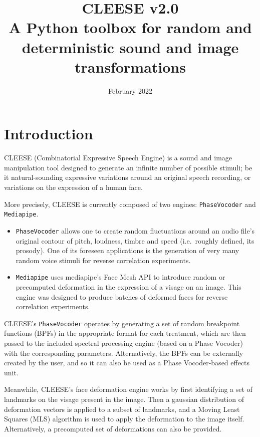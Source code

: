 \documentclass[oneside,10pt]{article}
\begin{document}
\title{\textbf{CLEESE} {\large v2.0} \\ {\Large A Python toolbox for random and
deterministic sound and image transformations}}
\author{February 2022}
\date{}
\maketitle

\tableofcontents

\section{Introduction}

CLEESE (Combinatorial Expressive Speech Engine) is a sound and image
manipulation tool designed to generate an infinite number of possible stimuli;
be it natural-sounding expressive variations around an original speech
recording, or variations on the expression of a human face.

More precisely, CLEESE is currently composed of two engines:
\texttt{PhaseVocoder} and \texttt{Mediapipe}.

\begin{itemize}
    \item \texttt{PhaseVocoder} allows one to create random fluctuations around
        an audio file's original contour of pitch, loudness, timbre and speed
        (i.e.\ roughly defined, its prosody). One of its foreseen applications
        is the generation of very many random voice stimuli for reverse
        correlation experiments.
    \item \texttt{Mediapipe} uses mediapipe's Face Mesh API to introduce random
        or precomputed deformation in the expression of a visage on an image.
        This engine was designed to produce batches of deformed faces for
        reverse correlation experiments.
\end{itemize}

CLEESE's \texttt{PhaseVocoder} operates by generating a set of random
breakpoint functions (BPFs) in the appropriate format for each treatment, which
are then passed to the included spectral processing engine (based on a Phase
Vocoder) with the corresponding parameters. Alternatively, the BPFs can be
externally created by the user, and so it can also be used as a Phase
Vocoder-based effects unit.

Meanwhile, CLEESE's face deformation engine works by first identifying a set of
landmarks on the visage present in the image. Then a gaussian distribution of
deformation vectors is applied to a subset of landmarks, and a Moving Least
Squares (MLS) algorithm is used to apply the deformation to the image itself.
Alternatively, a precomputed set of deformations can also be provided.
\end{document}
